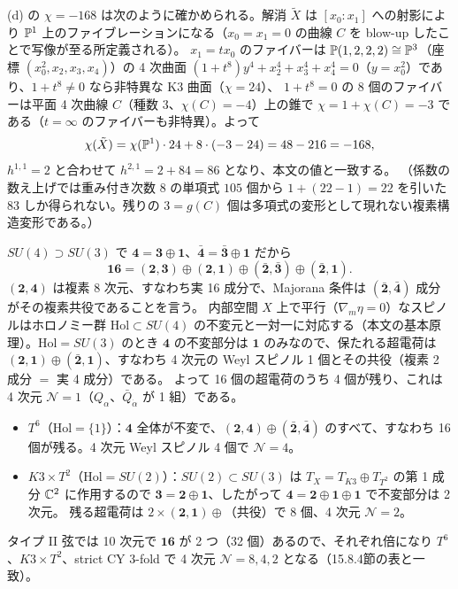 (d) の $\chi = -168$ は次のように確かめられる。解消 $\tilde X$ は $[x_0:x_1]$ への射影により $\mathbb{P}^1$ 上のファイブレーションになる（$x_0 = x_1 = 0$ の曲線 $C$ を blow-up したことで写像が至る所定義される）。
$x_1 = tx_0$ のファイバーは $\mathbb{P}(1,2,2,2)\cong\mathbb{P}^3$（座標 $(x_0^2,x_2,x_3,x_4)$）の 4 次曲面 $(1+t^8)y^4 + x_2^4+x_3^4+x_4^4 = 0$（$y = x_0^2$）であり、$1+t^8\ne0$ なら非特異な K3 曲面（$\chi = 24$）、
$1+t^8 = 0$ の 8 個のファイバーは平面 4 次曲線 $C$（種数 3、$\chi(C) = -4$）上の錐で $\chi = 1 + \chi(C) = -3$ である（$t = \infty$ のファイバーも非特異）。よって
\[
\chi(\tilde X) = \chi(\mathbb{P}^1)\cdot24 + 8\cdot(-3-24) = 48 - 216 = -168 ,
\]
$h^{1,1} = 2$ と合わせて $h^{2,1} = 2+84 = 86$ となり、本文の値と一致する。
（係数の数え上げでは重み付き次数 8 の単項式 $105$ 個から $1 + (22-1) = 22$ を引いた $83$ しか得られない。残りの $3 = g(C)$ 個は多項式の変形として現れない複素構造変形である。）

$SU(4)\supset SU(3)$ で $\mathbf4 = \mathbf3\oplus\mathbf1$、$\bar{\mathbf4} = \bar{\mathbf3}\oplus\mathbf1$ だから
\[
\mathbf{16} = (\mathbf2,\mathbf3)\oplus(\mathbf2,\mathbf1)\oplus(\bar{\mathbf2},\bar{\mathbf3})\oplus(\bar{\mathbf2},\mathbf1).
\]
$(\mathbf 2,\mathbf4)$ は複素 8 次元、すなわち実 16 成分で、Majorana 条件は $(\bar{\mathbf2},\bar{\mathbf4})$ 成分がその複素共役であることを言う。
内部空間 $X$ 上で平行（$\nabla_m\eta = 0$）なスピノルはホロノミー群 $\mathrm{Hol}\subset SU(4)$ の不変元と一対一に対応する（本文の基本原理）。$\mathrm{Hol} = SU(3)$ のとき $\mathbf4$ の不変部分は $\mathbf1$ のみなので、保たれる超電荷は
$(\mathbf2,\mathbf1)\oplus(\bar{\mathbf2},\mathbf1)$、すなわち 4 次元の Weyl スピノル 1 個とその共役（複素 2 成分 $=$ 実 4 成分）である。
よって 16 個の超電荷のうち 4 個が残り、これは 4 次元 $\mathcal N = 1$（$Q_\alpha$、$\bar Q_{\dot\alpha}$ が 1 組）である。

\begin{itemize}
\item $T^6$（$\mathrm{Hol} = \{1\}$）：$\mathbf4$ 全体が不変で、$(\mathbf2,\mathbf4)\oplus(\bar{\mathbf2},\bar{\mathbf4})$ のすべて、すなわち 16 個が残る。4 次元 Weyl スピノル 4 個で $\mathcal N = 4$。
\item $K3\times T^2$（$\mathrm{Hol} = SU(2)$）：$SU(2)\subset SU(3)$ は $T_X = T_{K3}\oplus T_{T^2}$ の第 1 成分 $\mathbb{C}^2$ に作用するので $\mathbf3 = \mathbf2\oplus\mathbf1$、したがって $\mathbf4 = \mathbf2\oplus\mathbf1\oplus\mathbf1$ で不変部分は 2 次元。
残る超電荷は $2\times(\mathbf2,\mathbf1)\oplus$（共役）で $8$ 個、4 次元 $\mathcal N = 2$。
\end{itemize}
タイプ II 弦では 10 次元で $\mathbf{16}$ が 2 つ（32 個）あるので、それぞれ倍になり $T^6$、$K3\times T^2$、strict CY 3-fold で 4 次元 $\mathcal N = 8,4,2$ となる（15.8.4節の表と一致）。
